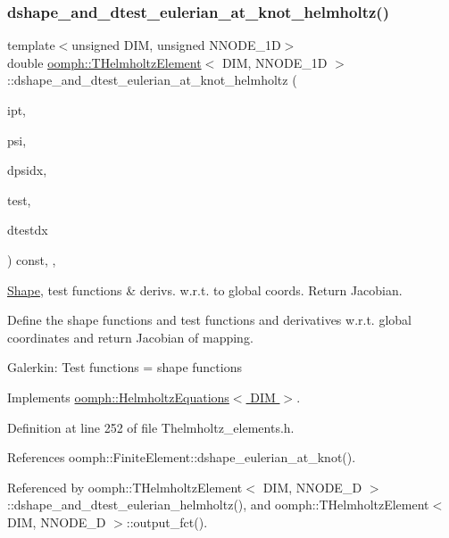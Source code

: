 \subsubsection{\texorpdfstring{dshape\+\_\+and\+\_\+dtest\+\_\+eulerian\+\_\+at\+\_\+knot\+\_\+helmholtz()}{dshape\_and\_dtest\_eulerian\_at\_knot\_helmholtz()}}
{\footnotesize\ttfamily template$<$unsigned D\+IM, unsigned N\+N\+O\+D\+E\+\_\+1D$>$ \\
double \hyperlink{classoomph_1_1THelmholtzElement}{oomph\+::\+T\+Helmholtz\+Element}$<$ D\+IM, N\+N\+O\+D\+E\+\_\+1D $>$\+::dshape\+\_\+and\+\_\+dtest\+\_\+eulerian\+\_\+at\+\_\+knot\+\_\+helmholtz (\begin{DoxyParamCaption}\item[{const unsigned \&}]{ipt,  }\item[{\hyperlink{classoomph_1_1Shape}{Shape} \&}]{psi,  }\item[{\hyperlink{classoomph_1_1DShape}{D\+Shape} \&}]{dpsidx,  }\item[{\hyperlink{classoomph_1_1Shape}{Shape} \&}]{test,  }\item[{\hyperlink{classoomph_1_1DShape}{D\+Shape} \&}]{dtestdx }\end{DoxyParamCaption}) const\hspace{0.3cm}{\ttfamily [inline]}, {\ttfamily [protected]}, {\ttfamily [virtual]}}



\hyperlink{classoomph_1_1Shape}{Shape}, test functions \& derivs. w.\+r.\+t. to global coords. Return Jacobian. 

Define the shape functions and test functions and derivatives w.\+r.\+t. global coordinates and return Jacobian of mapping.

Galerkin\+: Test functions = shape functions 

Implements \hyperlink{classoomph_1_1HelmholtzEquations_a4559bf3e98ee0efa33f6efc11292ad3e}{oomph\+::\+Helmholtz\+Equations$<$ D\+I\+M $>$}.



Definition at line 252 of file Thelmholtz\+\_\+elements.\+h.



References oomph\+::\+Finite\+Element\+::dshape\+\_\+eulerian\+\_\+at\+\_\+knot().



Referenced by oomph\+::\+T\+Helmholtz\+Element$<$ D\+I\+M, N\+N\+O\+D\+E\+\_\+D $>$\+::dshape\+\_\+and\+\_\+dtest\+\_\+eulerian\+\_\+helmholtz(), and oomph\+::\+T\+Helmholtz\+Element$<$ D\+I\+M, N\+N\+O\+D\+E\+\_\+D $>$\+::output\+\_\+fct().

